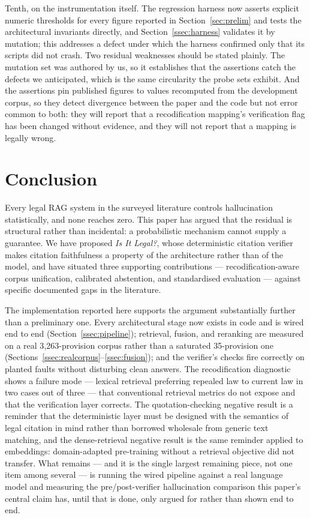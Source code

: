\documentclass[conference]{IEEEtran}
\begin{document}
Tenth, on the instrumentation itself. The regression harness now asserts
explicit numeric thresholds for every figure reported in
Section~\ref{sec:prelim} and tests the architectural invariants directly, and
Section~\ref{ssec:harness} validates it by mutation; this addresses a defect
under which the harness confirmed only that its scripts did not crash. Two
residual weaknesses should be stated plainly. The mutation set was authored by
us, so it establishes that the assertions catch the defects we anticipated,
which is the same circularity the probe sets exhibit. And the assertions pin
published figures to values recomputed from the development corpus, so they
detect divergence between the paper and the code but not error common to both:
they will report that a recodification mapping's verification flag has been
changed without evidence, and they will not report that a mapping is legally
wrong.

\section{Conclusion}

Every legal RAG system in the surveyed literature controls hallucination statistically, and none reaches zero. This paper has argued that the residual is structural rather than incidental: a probabilistic mechanism cannot supply a guarantee. We have proposed \textit{Is It Legal?}, whose deterministic citation verifier makes citation faithfulness a property of the architecture rather than of the model, and have situated three supporting contributions — recodification-aware corpus unification, calibrated abstention, and standardised evaluation — against specific documented gaps in the literature.

The implementation reported here supports the argument substantially further than a preliminary one. Every architectural stage now exists in code and is wired end to end (Section~\ref{ssec:pipeline}); retrieval, fusion, and reranking are measured on a real 3{,}263-provision corpus rather than a saturated 35-provision one (Sections~\ref{ssec:realcorpus}--\ref{ssec:fusion}); and the verifier's checks fire correctly on planted faults without disturbing clean answers. The recodification diagnostic shows a failure mode --- lexical retrieval preferring repealed law to current law in two cases out of three --- that conventional retrieval metrics do not expose and that the verification layer corrects. The quotation-checking negative result is a reminder that the deterministic layer must be designed with the semantics of legal citation in mind rather than borrowed wholesale from generic text matching, and the dense-retrieval negative result is the same reminder applied to embeddings: domain-adapted pre-training without a retrieval objective did not transfer. What remains --- and it is the single largest remaining piece, not one item among several --- is running the wired pipeline against a real language model and measuring the pre/post-verifier hallucination comparison this paper's central claim has, until that is done, only argued for rather than shown end to end.
\end{document}
